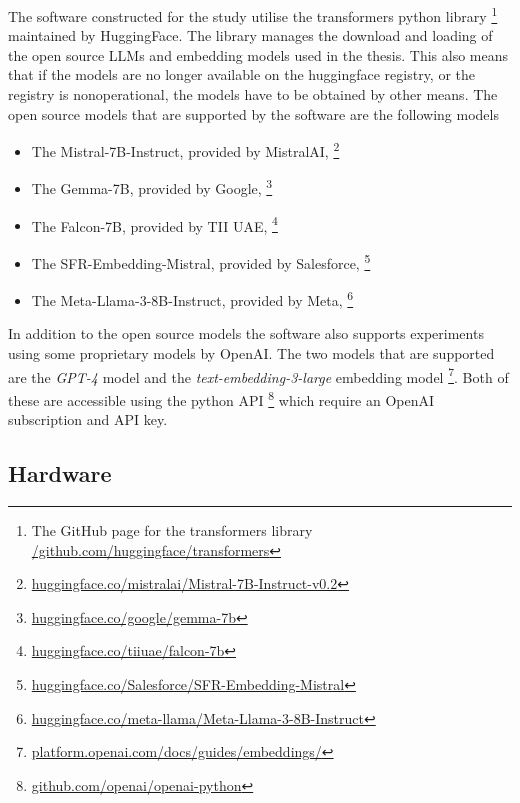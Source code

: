 The software constructed for the study utilise the transformers python library \footnote{The GitHub page for the transformers library \href{https://github.com/huggingface/transformers}{/github.com/huggingface/transformers}} maintained by HuggingFace. The library manages the download and loading of the open source \gls{LLM}s and embedding models used in the thesis. This also means that if the models are no longer available on the huggingface registry, or the registry is nonoperational, the models have to be obtained by other means. The open source models that are supported by the software are the following models


\begin{itemize}
        \item The Mistral-7B-Instruct, provided by MistralAI, \footnote{\href{https://huggingface.co/mistralai/Mistral-7B-Instruct-v0.2}{huggingface.co/mistralai/Mistral-7B-Instruct-v0.2}}
        \item The Gemma-7B, provided by Google, \footnote{\href{https://huggingface.co/google/gemma-7b}{huggingface.co/google/gemma-7b}}
        \item The Falcon-7B, provided by TII UAE, \footnote{\href{https://huggingface.co/tiiuae/falcon-7b}{huggingface.co/tiiuae/falcon-7b}}
        \item The SFR-Embedding-Mistral, provided by Salesforce, \footnote{\href{https://huggingface.co/Salesforce/SFR-Embedding-Mistral}{huggingface.co/Salesforce/SFR-Embedding-Mistral}}
        \item The Meta-Llama-3-8B-Instruct, provided by Meta, \footnote{\href{https://huggingface.co/meta-llama/Meta-Llama-3-8B-Instruct}{huggingface.co/meta-llama/Meta-Llama-3-8B-Instruct}}
\end{itemize}


In addition to the open source models the software also supports experiments using some proprietary models by OpenAI. The two models that are supported are the \textit{GPT-4} model and the \textit{text-embedding-3-large} embedding model \footnote{\href{https://platform.openai.com/docs/guides/embeddings}{platform.openai.com/docs/guides/embeddings/}}. Both of these are accessible using the python API \footnote{\href{https://github.com/openai/openai-python}{github.com/openai/openai-python}} which require an OpenAI subscription and API key.


\subsection{Hardware}


